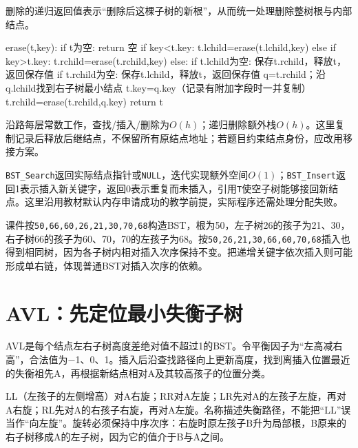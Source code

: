 删除的递归返回值表示``删除后这棵子树的新根''，从而统一处理删除整树根与内部结点。

\par\medskip\noindent\begin{minipage}{\linewidth}
\begin{codeblock}[language={}]
erase(t,key):
    if t为空: return 空
    if key<t.key: t.lchild=erase(t.lchild,key)
    else if key>t.key: t.rchild=erase(t.rchild,key)
    else:
        if t.lchild为空: 保存t.rchild，释放t，返回保存值
        if t.rchild为空: 保存t.lchild，释放t，返回保存值
        q=t.rchild；沿q.lchild找到右子树最小结点
        t.key=q.key（记录有附加字段时一并复制）
        t.rchild=erase(t.rchild,q.key)
    return t
\end{codeblock}
\end{minipage}\par\medskip

沿路每层常数工作，查找/插入/删除为\(O(h)\)；递归删除额外栈\(O(h)\)。这里复制记录后释放后继结点，不保留所有原结点地址；若题目约束结点身份，应改用移接方案。

\texttt{BST\_Search}返回实际结点指针或\texttt{NULL}，迭代实现额外空间\(O(1)\)；\texttt{BST\_Insert}返回1表示插入新关键字，返回0表示重复而未插入，引用\texttt{T}使空子树能够接回新结点。这里沿用教材默认内存申请成功的教学前提，实际程序还需处理分配失败。

课件按\texttt{50,\allowbreak{}66,\allowbreak{}60,\allowbreak{}26,\allowbreak{}21,\allowbreak{}30,\allowbreak{}70,\allowbreak{}68}构造BST，根为50，左子树26的孩子为21、30，右子树66的孩子为60、70，70的左孩子为68。按\texttt{50,\allowbreak{}26,\allowbreak{}21,\allowbreak{}30,\allowbreak{}66,\allowbreak{}60,\allowbreak{}70,\allowbreak{}68}插入也得到相同树，因为各子树内相对插入次序保持不变。把递增关键字依次插入则可能形成单右链，体现普通BST对插入次序的依赖。

\section{AVL：先定位最小失衡子树}\label{DS07-05}

AVL是每个结点左右子树高度差绝对值不超过1的BST。令平衡因子为“左高减右高”，合法值为\ensuremath{-}1、0、1。插入后沿查找路径向上更新高度，找到离插入位置最近的失衡祖先A，再根据新结点相对A及其较高孩子的位置分类。

LL（左孩子的左侧增高）对A右旋；RR对A左旋；LR先对A的左孩子左旋，再对A右旋；RL先对A的右孩子右旋，再对A左旋。名称描述失衡路径，不能把``LL''误当作``向左旋''。旋转必须保持中序次序：右旋时原左孩子B升为局部根，B原来的右子树移成A的左子树，因为它的值介于B与A之间。

